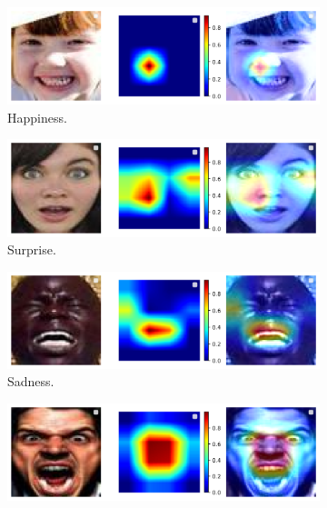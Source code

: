 \begin{figure}[ht]
  \centering
  \begin{subfigure}{0.47\linewidth}
    \includegraphics[width=\linewidth]{xai_happiness.png}
    \caption{Happiness.}
    \label{fig:xai1}
  \end{subfigure}
  \hfill
  \begin{subfigure}{0.47\linewidth}
    \includegraphics[width=\linewidth]{xai_surprise.png}
    \caption{Surprise.}
    \label{fig:xai2}
  \end{subfigure}
  \hfill
  \begin{subfigure}{0.47\linewidth}
    \includegraphics[width=\linewidth]{xai_sadness.png}
    \caption{Sadness.}
    \label{fig:xai3}
  \end{subfigure}
  \hfill
  \begin{subfigure}{0.47\linewidth}
    \includegraphics[width=\linewidth]{xai_anger.png}

\end{subfigure}
\end{figure}
